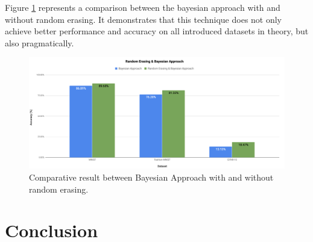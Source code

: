 Figure \ref{fig:random_erasiong_result} represents a comparison between the bayesian approach with
and without random erasing. It demonstrates that this technique does not only  achieve better
performance and accuracy on all introduced datasets in theory, but also pragmatically.


\begin{figure}
  \centering
  \label{fig:random_erasiong_result}
  \includegraphics[width=1\textwidth]{fig/contribution/random-erasing-result}
  \caption{Comparative result between Bayesian Approach with and without random erasing.}
\end{figure}

\chapter{Conclusion}

